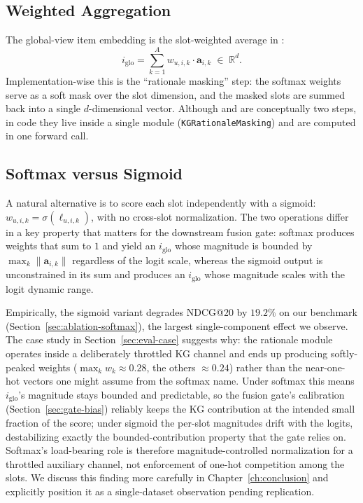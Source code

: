 \subsection{Weighted Aggregation}
\label{sec:softmax-agg}

The global-view item embedding is the slot-weighted average in :
\begin{equation}
\label{eq:iglo}
i_{\mathrm{glo}} = \sum_{k=1}^{A} w_{u, i, k} \cdot \mathbf{a}_{i, k} \;\in\; \mathbb{R}^{d}.
\end{equation}
Implementation-wise this is the ``rationale masking'' step: the softmax weights serve as a soft mask over the slot dimension, and the masked slots are summed back into a single $d$-dimensional vector. Although  and  are conceptually two steps, in code they live inside a single module (\texttt{KGRationaleMasking}) and are computed in one forward call.

\subsection{Softmax versus Sigmoid}
\label{sec:softmax-vs-sigmoid}

A natural alternative is to score each slot independently with a sigmoid: $w_{u,i,k} = \sigma(\ell_{u,i,k})$, with no cross-slot normalization. The two operations differ in a key property that matters for the downstream fusion gate: softmax produces weights that sum to $1$ and yield an $i_{\mathrm{glo}}$ whose magnitude is bounded by $\max_k \|\mathbf{a}_{i,k}\|$ regardless of the logit scale, whereas the sigmoid output is unconstrained in its sum and produces an $i_{\mathrm{glo}}$ whose magnitude scales with the logit dynamic range.

Empirically, the sigmoid variant degrades NDCG@20 by $19.2\%$ on our benchmark (Section~\ref{sec:ablation-softmax}), the largest single-component effect we observe. The case study in Section~\ref{sec:eval-case} suggests why: the rationale module operates inside a deliberately throttled KG channel and ends up producing softly-peaked weights ($\max_k w_k \approx 0.28$, the others $\approx 0.24$) rather than the near-one-hot vectors one might assume from the softmax name. Under softmax this means $i_{\mathrm{glo}}$'s magnitude stays bounded and predictable, so the fusion gate's calibration (Section~\ref{sec:gate-bias}) reliably keeps the KG contribution at the intended small fraction of the score; under sigmoid the per-slot magnitudes drift with the logits, destabilizing exactly the bounded-contribution property that the gate relies on. Softmax's load-bearing role is therefore magnitude-controlled normalization for a throttled auxiliary channel, not enforcement of one-hot competition among the slots. We discuss this finding more carefully in Chapter~\ref{ch:conclusion} and explicitly position it as a single-dataset observation pending replication.

